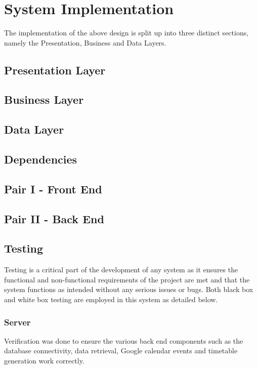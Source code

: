 \section{System Implementation}

The implementation of the above design is split up into three distinct sections, namely the Presentation, Business and Data Layers.

\subsection{Presentation Layer}
\subsection{Business Layer}
\subsection{Data Layer}
\subsection{Dependencies}

\subsection{Pair I - Front End}
\subsection{Pair II - Back End}

\subsection{Testing}

Testing is a critical part of the development of any system as it ensures the functional and non-functional requirements of the project are met and that the system functions as intended without any serious issues or bugs. Both black box and white box testing are employed in this system as detailed below.

\subsubsection{Server}

Verification was done to ensure the various back end components such as the database connectivity, data retrieval, Google calendar events and timetable generation work correctly.

